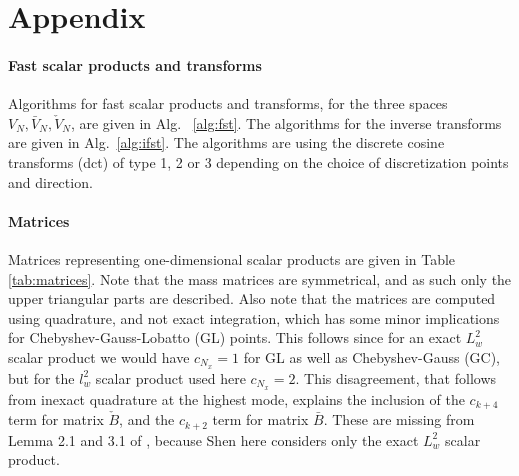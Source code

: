 \documentclass[preprint]{elsarticle}
\newcommand{\N}[1]{\check{#1}}
\newcommand{\D}[1]{\bar{#1}}
\begin{document}
%
%
%
%
%



\section*{Appendix}
\label{sec:app}

\paragraph*{Fast scalar products and transforms}
Algorithms for fast scalar products and transforms, for the three 
spaces $V_N, \D{V}_N, \N{V}_N$, are given in Alg. ~\ref{alg:fst}. The 
algorithms for the inverse transforms are given in Alg.~\ref{alg:ifst}. The 
algorithms are using the discrete cosine transforms (dct) of type 1, 2 or 3 
depending on the choice of discretization points and direction.

\paragraph*{Matrices}
Matrices representing one-dimensional scalar products are given in Table \ref{tab:matrices}. Note that the mass matrices are symmetrical, and as such only the upper triangular parts are described. Also note that the matrices are computed using quadrature, and not exact integration, which has some minor implications for Chebyshev-Gauss-Lobatto (GL) points. This follows since for an exact $L^2_w$ scalar product we would have $c_{N_x}=1$ for GL as well as Chebyshev-Gauss (GC), but for the $l^2_w$ scalar product used here $c_{N_x}=2$. This disagreement, that follows from inexact quadrature at the highest mode, explains the inclusion of the $c_{k+4}$ term for matrix $\N{B}$, and the $c_{k+2}$ term for matrix $\D{B}$. These are missing from Lemma 2.1 and 3.1 of \cite{Shen95}, because Shen here considers only the exact $L^2_w$ scalar product.
\end{document}
